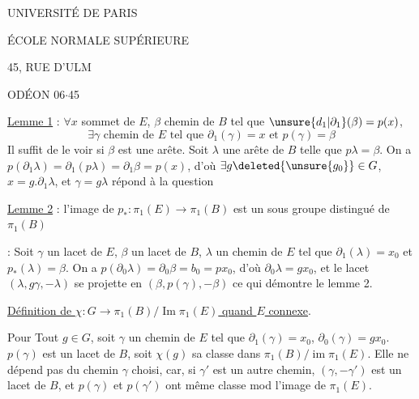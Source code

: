 \begin{center}
UNIVERSITÉ DE PARIS


ÉCOLE NORMALE SUPÉRIEURE


45, RUE D'ULM

ODÉON 06$\cdot$45

\end{center}


\uline{Lemme 1} : $\forall x$ sommet de $E$, $\beta$ chemin de $B$ tel que $\unsure{d_1|\partial_1}(\beta)=p(x)$,
\[
\exists\gamma\text{ chemin de }E\text{ tel que }\partial_1(\gamma)=x\text{ et }p(\gamma)=\beta
\]
 Il suffit de le voir si $\beta$ est une arête. Soit $\lambda$ une arête de $B$ telle que $p\lambda=\beta$. On a \deleted{$\unsure{\partial}$} $p(\partial_1\lambda)=\partial_1(p\lambda)=\partial_1\beta=p(x)$, d'où $\exists g\deleted{\unsure{g_0}}\in G$, $x=g.\partial_1\lambda$, et $\gamma=g\lambda$ répond à la question

\uline{Lemme 2} : l'image de $p_*:\pi_1(E)\to\pi_1(B)$ est un sous groupe distingué de $\pi_1(B)$

 : Soit $\gamma$ un lacet de  $E$, $\beta$ un lacet de $B$, $\lambda$ un chemin de $E$ tel que $\partial_1(\lambda)=x_0$ et $p_*(\lambda)=\beta$. On a $p(\partial_0\lambda)=\partial_0\beta=b_0=px_0$, d'où $\partial_0\lambda=gx_0$, et le lacet $(\lambda,g\gamma,-\lambda)$ se projette en $(\beta,p(\gamma),-\beta)$ ce qui démontre le lemme 2.

\uline{Définition de $\chi:G\to\pi_1(B)/\operatorname{Im}\pi_1(E)$ quand $E$ connexe}.

Pour Tout $g\in G$, soit $\gamma$ un chemin de $E$ tel que $\partial_1(\gamma)=x_0$, $\partial_0(\gamma)=gx_0$.  $p(\gamma)$ est un lacet de $B$, soit $\chi(g)$ sa classe dans $\pi_1(B)/\operatorname{im}\pi_1(E)$. Elle ne dépend pas du chemin $\gamma$ choisi, car, si $\gamma'$ est un autre chemin, $(\gamma,-\gamma')$ est un lacet de $B$, et  $p(\gamma)$ et $p(\gamma')$ ont même classe mod l'image de $\pi_1(E)$.

